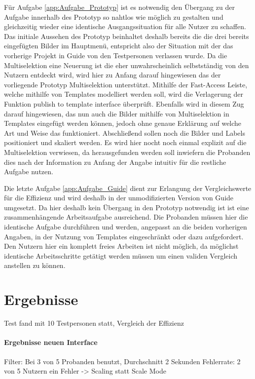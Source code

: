 Für Aufgabe \ref{app:Aufgabe_Prototyp} ist es notwendig den Übergang zu der Aufgabe innerhalb des Prototyp so nahtlos wie möglich zu gestalten und gleichzeitig wieder eine identische Ausgangssituation für alle Nutzer zu schaffen.
Das initiale Aussehen des Prototyp beinhaltet deshalb bereits die die drei bereits eingefügten Bilder im Hauptmenü, entspricht also der Situation mit der das vorherige Projekt in Guide von den Testpersonen verlassen wurde.
Da die Multiselektion eine Neuerung ist die eher unwahrscheinlich selbstständig von den Nutzern entdeckt wird, wird hier zu Anfang darauf hingewiesen das der vorliegende Prototyp Multiselektion unterstützt.
Mithilfe der Fast-Access Leiste, welche mithilfe von Templates modelliert werden soll, wird die Verlagerung der Funktion \glqq publish to template interface\grqq{} überprüft.
Ebenfalls wird in diesem Zug darauf hingewiesen, das nun auch die Bilder mithilfe von Multiselektion in Templates eingefügt werden können, jedoch ohne genaue Erklärung auf welche Art und Weise das funktioniert.
Abschließend sollen noch die Bilder und Labels positioniert und skaliert werden.
Es wird hier nocht noch einmal explizit auf die Multiselektion verwiesen, da herausgefunden werden soll inwiefern die Probanden dies nach der Information zu Anfang der Angabe intuitiv für die restliche Aufgabe nutzen.

Die letzte Aufgabe \ref{app:Aufgabe_Guide} dient zur Erlangung der Vergleichswerte für die Effizienz und wird deshalb in der unmodifizierten Version von Guide umgesetzt.
Da hier deshalb kein Übergang in den Prototyp notwendig ist ist eine zusammenhängende Arbeitsaufgabe ausreichend.
Die Probanden müssen hier die identische Aufgabe durchführen und werden, angepasst an die beiden vorherigen Angaben, in der Nutzung von Templates eingeschränkt oder dazu aufgefordert.
Den Nutzern hier ein komplett freies Arbeiten ist nicht möglich, da möglichst identische Arbeitsschritte getätigt werden müssen um einen validen Vergleich anstellen zu können.

\section {Ergebnisse}
Test fand mit 10 Testpersonen statt, Vergleich der Effizienz \cite{.h}

\paragraph{Ergebnisse neuen Interface}
Filter: Bei 3 von 5 Probanden benutzt, Durchschnitt 2 Sekunden
Fehlerrate: 2 von 5 Nutzern ein Fehler -> Scaling statt Scale Mode

